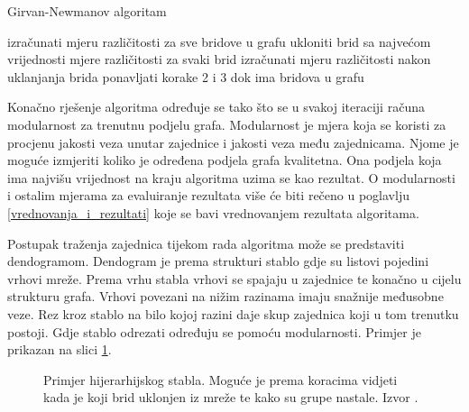 \bigskip
\begin{algorithm}
\caption{Girvan-Newmanov algoritam}
\begin{algorithmic}[1]
	\STATE izračunati mjeru različitosti za sve bridove u grafu
	\STATE ukloniti brid sa najvećom vrijednosti mjere različitosti
	\STATE za svaki brid izračunati mjeru različitosti nakon uklanjanja brida
	\STATE ponavljati korake 2 i 3 dok ima bridova u grafu
\end{algorithmic}
\end{algorithm}
\bigskip

Konačno rješenje algoritma određuje se tako što se u svakoj iteraciji računa modularnost za trenutnu podjelu grafa. Modularnost je mjera koja se koristi za procjenu jakosti veza unutar zajednice i jakosti veza među zajednicama. Njome je moguće izmjeriti koliko je određena podjela grafa kvalitetna. Ona podjela koja ima najvišu vrijednost na kraju algoritma uzima se kao rezultat. O modularnosti i ostalim mjerama za evaluiranje rezultata više će biti rečeno u poglavlju \ref{vrednovanja_i_rezultati} koje se bavi vrednovanjem rezultata algoritama.


Postupak traženja zajednica tijekom rada algoritma može se predstaviti dendogramom. Dendogram je prema strukturi stablo gdje su listovi pojedini vrhovi mreže. Prema vrhu stabla vrhovi se spajaju u zajednice te konačno u cijelu strukturu grafa. Vrhovi povezani na nižim razinama imaju snažnije međusobne veze. Rez kroz stablo na bilo kojoj razini daje skup zajednica koji u tom trenutku postoji. Gdje stablo odrezati određuju se pomoću modularnosti. Primjer je prikazan na slici \ref{fig:dendogram}.

\begin{figure}
	\caption{Primjer hijerarhijskog stabla. Moguće je prema koracima vidjeti kada je koji brid uklonjen iz mreže te kako su grupe nastale. Izvor \cite{girvan2002community}.}
	\label{fig:dendogram}
\end{figure}

